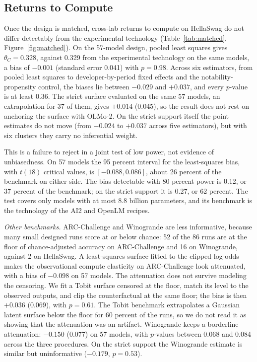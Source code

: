 \documentclass[AER,finalmode]{AEA}
\theoremstyle{definition}
\theoremstyle{remark}
\begin{document}
\subsection{Returns to Compute}

Once the design is matched, cross-lab returns to compute on HellaSwag do not differ detectably from the experimental
technology (Table~\ref{tab:matched}, Figure~\ref{fig:matched}). On the 57-model design, pooled least squares gives
$\theta_C=0.328$, against 0.329 from the experimental technology on the same models, a bias of $-0.001$ (standard error
0.041) with $p=0.98$. Across six estimators, from pooled least squares to developer-by-period fixed effects and the
notability-propensity control, the biases lie between $-0.029$ and $+0.037$, and every $p$-value is at least 0.36. The
strict surface evaluated on the same 57 models, an extrapolation for 37 of them, gives $+0.014$ (0.045), so the result
does not rest on anchoring the surface with OLMo-2. On the strict support itself the point estimates do not move (from
$-0.024$ to $+0.037$ across five estimators), but with six clusters they carry no inferential weight.

This is a failure to reject in a joint test of low power, not evidence of unbiasedness. On 57 models the 95 percent
interval for the least-squares bias, with $t(18)$ critical values, is $[-0.088,0.086]$, about 26 percent of the
benchmark on either side. The bias detectable with 80 percent power is 0.12, or 37 percent of the benchmark; on the
strict support it is 0.27, or 62 percent. The test covers only models with at most 8.8 billion parameters, and its
benchmark is the technology of the AI2 and OpenLM recipes.

\textit{Other benchmarks.} ARC-Challenge and Winogrande are less informative, because many small designed runs score at
or below chance: 52 of the 86 runs are at the floor of chance-adjusted accuracy on ARC-Challenge and 16 on Winogrande,
against 2 on HellaSwag. A least-squares surface fitted to the clipped log-odds makes the observational compute
elasticity on ARC-Challenge look attenuated, with a bias of $-0.098$ on 57 models. The attenuation does not survive
modeling the censoring. We fit a Tobit surface censored at the floor, match its level to the observed outputs, and clip
the counterfactual at the same floor; the bias is then $+0.036$ (0.069), with $p=0.61$. The Tobit benchmark
extrapolates a Gaussian latent surface below the floor for 60 percent of the runs, so we do not read it as showing that
the attenuation was an artifact. Winogrande keeps a borderline attenuation: $-0.150$ (0.077) on 57 models, with
$p$-values between 0.068 and 0.084 across the three procedures. On the strict support the Winogrande estimate is
similar but uninformative ($-0.179$, $p=0.53$).
\end{document}
